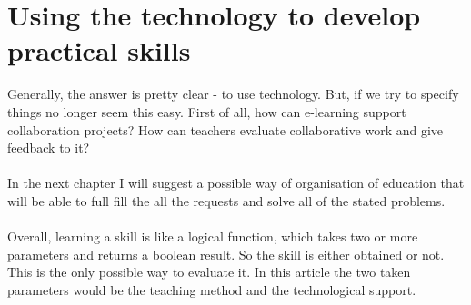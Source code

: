 \documentclass[10pt,oneside,english,a4paper]{article}
\begin{document}
\section{Using the technology to develop practical skills}
 \label{chan}
Generally, the answer is pretty clear - to use technology. But, if we try to specify things no longer seem this easy. First of all, how can e-learning support collaboration projects? How can teachers evaluate collaborative work and give feedback to it? \paragraph{}
In the next chapter I will suggest a possible way of organisation of education that will be able to full fill the all the requests and solve all of the stated problems.
\paragraph{} 
Overall, learning a skill is like a logical function, which takes two or more parameters and returns a  boolean result. So the skill is either obtained or not. This is the only possible way to evaluate it.  In this article the two taken parameters would be the teaching method and the technological support.
\end{document}
